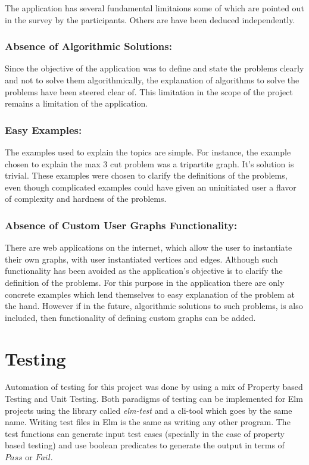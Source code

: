 The application has several fundamental limitaions some of which are pointed
out in the survey by the participants. Others are have been deduced
independently.

\subsubsection{Absence of Algorithmic Solutions:}
Since the objective of the application was to define and state the problems
clearly and not to solve them algorithmically, the explanation of algorithms to
solve the problems have been steered clear of. This limitation in the scope of
the project remains a limitation of the application.

\subsubsection{Easy Examples:}
The examples used to explain the topics are simple. For instance, the example
chosen to explain the max 3 cut problem was a tripartite graph.  It's solution
is trivial. These examples were chosen to clarify the definitions of the
problems, even though complicated examples could have given an uninitiated user
a flavor of complexity and hardness of the problems.

\subsubsection{Absence of Custom User Graphs Functionality:}
There are web applications on the internet, which allow the user to instantiate
their own graphs, with user instantiated vertices and edges. Although such
functionality has been avoided as the application's objective is to clarify the
definition of the problems. For this purpose in the application there are only
concrete examples which lend themselves to easy explanation of the problem at
the hand. However if in the future, algorithmic solutions to such problems, is
also included, then functionality of defining custom graphs can be added.

\section{Testing}
Automation of testing for this project was done by using a mix of Property
based Testing and Unit Testing. Both paradigms of testing can be implemented
for Elm projects using the library called \emph{elm-test} and a cli-tool which
goes by the same name. Writing test files in Elm is the same as writing any
other program. The test functions can generate input test cases (specially in
the case of property based testing) and use boolean predicates to generate the
output in terms of $Pass$ or $Fail$.

